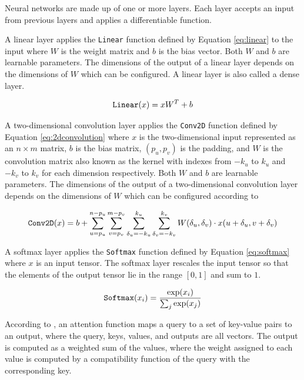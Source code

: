 
Neural networks are made up of one or more layers. Each layer accepts an input from previous layers and applies a differentiable function.

A linear layer applies the \verb|Linear| function defined by Equation \ref{eq:linear} to the input where $W$ is the weight matrix and $b$ is the bias vector. Both $W$ and $b$ are learnable parameters. The dimensions of the output of a linear layer depends on the dimensions of $W$ which can be configured. A linear layer is also called a dense layer.

\begin{equation}
    \verb|Linear|(x) = xW^T + b
    \label{eq:linear}
\end{equation}

A two-dimensional convolution layer applies the \verb|Conv2D| function defined by Equation \ref{eq:2dconvolution} where $x$ is the two-dimensional input represented as an $n \times m$ matrix, $b$ is the bias matrix, $(p_u, p_v)$ is the padding, and $W$ is the convolution matrix also known as the kernel with indexes from $-k_u$ to $k_u$ and $-k_v$ to $k_v$ for each dimension respectively. Both $W$ and $b$ are learnable parameters. The dimensions of the output of a two-dimensional convolution layer depends on the dimensions of $W$ which can be configured according to \cite{DBLP:journals/corr/OSheaN15}

\begin{equation}
    \verb|Conv2D|(x) = b + \sum_{u = p_u}^{n - p_u} \sum_{v = p_v}^{m - p_v} \sum_{\delta_u = -k_u}^{k_u} \sum_{\delta_v = -k_v}^{k_v} W(\delta_u, \delta_v) \cdot x(u + \delta_u, v + \delta_v)
    \label{eq:2dconvolution}
\end{equation}

A softmax layer applies the \verb|Softmax| function defined by Equation \ref{eq:softmax} where $x$ is an input tensor. The softmax layer rescales the input tensor so that the elements of the output tensor lie in the range $[0, 1]$ and sum to $1$.

\begin{equation}
    \verb|Softmax|(x_i) = \frac{\exp(x_i)}{\sum_j \exp(x_j)}
    \label{eq:softmax}
\end{equation}

According to \cite{vaswani2017attention}, an attention function maps a query to a set of key-value pairs to an output, where the query, keys, values, and outputs are all vectors. The output is computed as a weighted sum of the values, where the weight assigned to each value is computed by a compatibility function of the query with the corresponding key.

